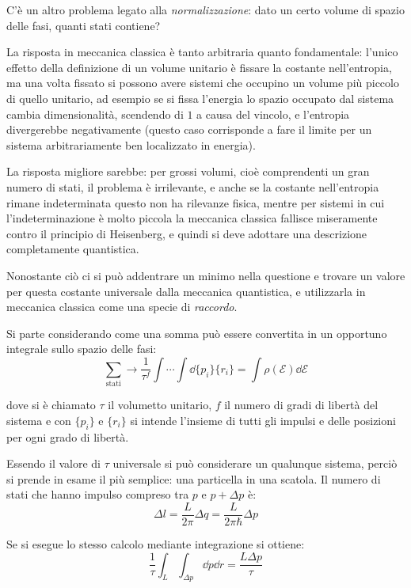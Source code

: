 C'è un altro problema legato alla \textit{normalizzazione}: dato un certo volume di spazio delle fasi, quanti stati contiene?

La risposta in meccanica classica è tanto arbitraria quanto fondamentale: l'unico effetto della definizione di un volume unitario è fissare la costante nell'entropia, ma una volta fissato si possono avere sistemi che occupino un volume più piccolo di quello unitario, ad esempio se si fissa l'energia lo spazio occupato dal sistema cambia dimensionalità, scendendo di $1$ a causa del vincolo, e l'entropia divergerebbe negativamente (questo caso corrisponde a fare il limite per un sistema arbitrariamente ben localizzato in energia).

La risposta migliore sarebbe: per grossi volumi, cioè comprendenti un gran numero di stati, il problema è irrilevante, e anche se la costante nell'entropia rimane indeterminata questo non ha rilevanze fisica, mentre per sistemi in cui l'indeterminazione è molto piccola la meccanica classica fallisce miseramente contro il principio di Heisenberg, e quindi si deve adottare una descrizione completamente quantistica.

Nonostante ciò ci si può addentrare un minimo nella questione e trovare un valore per questa costante universale dalla meccanica quantistica, e utilizzarla in meccanica classica come una specie di \textit{raccordo}.

Si parte considerando come una somma può essere convertita in un opportuno integrale sullo spazio delle fasi:
\begin{equation*}
\sum_{\text{stati}} \rightarrow \frac{1}{\tau^f} \int \cdots \int \dd \{p_i\} \{r_i\} = \int \rho(\mathcal{E}) \dd \mathcal{E}
\end{equation*}

\noindent dove si è chiamato $\tau$ il volumetto unitario, $f$ il numero di gradi di libertà del sistema e con $\{p_i\}$ e $\{r_i\}$ si intende l'insieme di tutti gli impulsi e delle posizioni per ogni grado di libertà.

Essendo il valore di $\tau$ universale si può considerare un qualunque sistema, perciò si prende in esame il più semplice: una particella in una scatola. Il numero di stati che hanno impulso compreso tra $p$ e $p + \Delta p$ è:
\begin{equation*}
\Delta l = \frac{L}{2\pi} \Delta q = \frac{L}{2 \pi \hbar} \Delta p
\end{equation*}

\noindent Se si esegue lo stesso calcolo mediante integrazione si ottiene:
\begin{equation*}
\frac{1}{\tau} \int_{L} \int_{\Delta p} \dd p \dd r = \frac{L \Delta p}{\tau}
\end{equation*}

